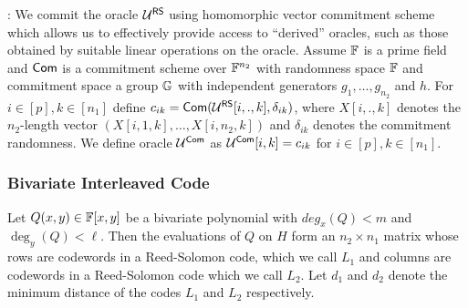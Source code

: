 : We commit the oracle $\mathcal{U}^{\mathsf{RS}}$ using
homomorphic vector commitment scheme which allows us to effectively provide
access to ``derived'' oracles, such as those obtained by suitable linear
operations on the oracle. Assume $\mathbb{F}$ is a prime field and $\mathsf{Com}$ is a
commitment scheme over $\mathbb{F}^{n_2}$ with randomness space $\mathbb{F}$ and commitment
space a group $\mathbb{G}$ with independent generators $g_1,\ldots,g_{n_2}$ and $h$.
For $i\in [p], k\in [n_1]$ define $c_{ik}=\mathsf{Com}(\mathcal{U}^{\mathsf{RS}}[i,.,k],\delta_{ik})$,
where $X[i,.,k]$ denotes the $n_2$-length vector $(X[i,1,k],\ldots,X[i,n_2,k])$
and $\delta_{ik}$ denotes the commitment randomness. We define oracle
$\mathcal{U}^{\mathsf{Com}}$ as $\mathcal{U}^{\mathsf{Com}}[i,k]=c_{ik}$ for $i\in [p],k\in [n_1]$.

\subsubsection{Bivariate Interleaved Code}
Let $Q(x,y)\in \mathbb{F}[x,y]$ be a bivariate polynomial with $deg_x(Q) < m$ and
$\deg_y(Q) < \ell$. Then the evaluations of $Q$ on $H$ form an $n_2\times n_1$
matrix whose rows are codewords in a Reed-Solomon code, which we call $L_1$ and columns
are codewords in a Reed-Solomon code which we call $L_2$. Let $d_1$ and $d_2$
denote the minimum distance of the codes $L_1$ and $L_2$
respectively.\smallskip

